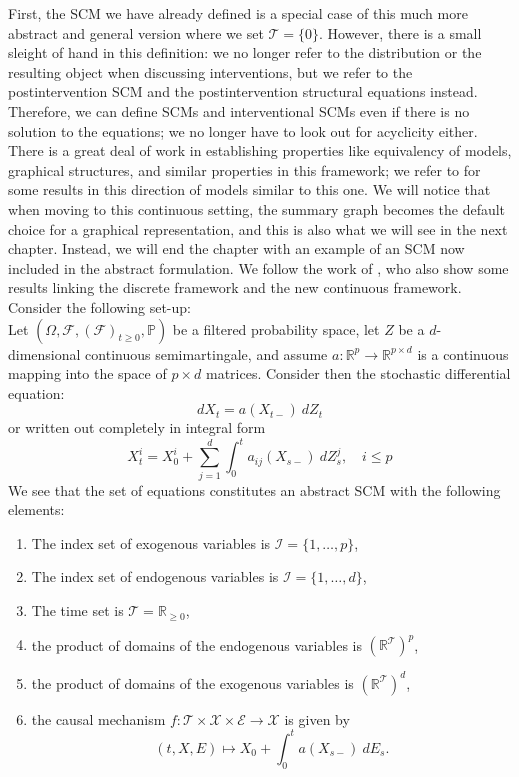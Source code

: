 \documentclass[11pt, a4paper]{memoir}
\theoremstyle{break}
\theoremstyle{break}
\theoremstyle{nonumberplain}
\newcommand{\mR}{\mathbb{R}}
\newcommand{\mP}{\mathbb{P}}
\begin{document}
First, the SCM we have already defined is a special case of this much more abstract and general version where we set $\mathcal{T}=\{0\}$. However, there is a small sleight of hand in this definition: we no longer refer to the distribution or the resulting object when discussing interventions, but we refer to the postintervention SCM and the postintervention structural equations instead. Therefore, we can define SCMs and interventional SCMs even if there is no solution to the equations; we no longer have to look out for acyclicity either. There is a great deal of work in establishing properties like equivalency of models, graphical structures, and similar properties in this framework; we refer to \cite{SCMGen} for some results in this direction of models similar to this one. We will notice that when moving to this continuous setting, the summary graph becomes the default choice for a graphical representation, and this is also what we will see in the next chapter. Instead, we will end the chapter with an example of an SCM now included in the abstract formulation. We follow the work of \cite{sokol2014}, who also show some results linking the discrete framework and the new continuous framework. Consider the following set-up:\\[5pt]
Let $(\Omega, \mathcal{F},(\mathcal{F})_{t\geq 0},\mP)$ be a filtered probability space, let $Z$ be a $d$-dimensional continuous semimartingale, and assume $a:\mR^p\to \mR^{p\times d}$ is a continuous mapping into the space of $p\times d$ matrices. Consider then the stochastic differential equation:
$$dX_t=a(X_{t-})\ dZ_t$$
or written out completely in integral form
\begin{equation}\label{org}
X_t^i=X_0^i+\sum_{j=1}^d\int_0^t a_{ij}(X_{s-})\ dZ_s^j,\quad i\leqslant p
\end{equation}
We see that the set of equations constitutes an abstract SCM with the following elements:
\begin{enumerate}[label=(\roman*)]
	\item The index set of exogenous variables is $\mathcal{I}=\{1,\ldots, p\}$,
	\item The index set of endogenous variables is $\mathcal{I}=\{1,\ldots, d\}$,
	\item The time set is $\mathcal{T}=\mR_{\geqslant 0}$,
	\item the product of domains of the endogenous variables is $(\mR^{\mathcal{T}})^p$,
	\item the product of domains of the exogenous variables is $(\mR^{\mathcal{T}})^d$,
	\item the causal mechanism $f:\mathcal{T}\times \mathcal{X}\times \mathcal{E}\to \mathcal{X}$ is given by $$(t,X,E)\mapsto X_0 + \int_0^t a(X_{s-})\ dE_s.$$
\end{enumerate}
\end{document}
